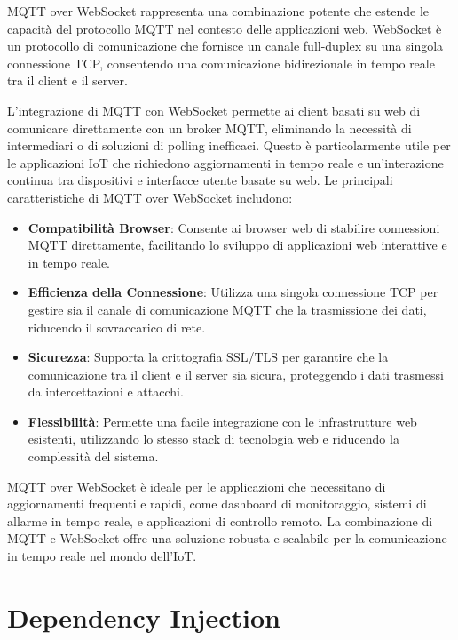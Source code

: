 \documentclass[12pt,a4paper,openright,twoside]{book}
\begin{document}
\ac{MQTT} over WebSocket rappresenta una combinazione potente che estende le capacità del protocollo \ac{MQTT} nel contesto delle applicazioni web. WebSocket è un protocollo 
di comunicazione che fornisce un canale full-duplex su una singola connessione \ac{TCP}, consentendo una comunicazione bidirezionale in tempo reale tra il client e il server.

L'integrazione di \ac{MQTT} con WebSocket permette ai client basati su web di comunicare direttamente con un broker \ac{MQTT}, eliminando la necessità di intermediari o di 
soluzioni di polling inefficaci. Questo è particolarmente utile per le applicazioni \ac{IoT} che richiedono aggiornamenti in tempo reale e un'interazione continua tra 
dispositivi e interfacce utente basate su web. Le principali caratteristiche di \ac{MQTT} over WebSocket includono:

\begin{itemize}
    \item \textbf{Compatibilità Browser}: 
    Consente ai browser web di stabilire connessioni \ac{MQTT} direttamente, facilitando lo sviluppo di applicazioni web interattive e in tempo reale.
    \item \textbf{Efficienza della Connessione}: 
    Utilizza una singola connessione \ac{TCP} per gestire sia il canale di comunicazione \ac{MQTT} che la trasmissione dei dati, riducendo il sovraccarico di rete.
    \item \textbf{Sicurezza}: 
    Supporta la crittografia SSL/TLS per garantire che la comunicazione tra il client e il server sia sicura, proteggendo i dati trasmessi da intercettazioni e attacchi.
    \item \textbf{Flessibilità}: 
    Permette una facile integrazione con le infrastrutture web esistenti, utilizzando lo stesso stack di tecnologia web e riducendo la complessità del sistema.
\end{itemize}

\ac{MQTT} over WebSocket è ideale per le applicazioni che necessitano di aggiornamenti frequenti e rapidi, come dashboard di monitoraggio, sistemi di allarme in tempo reale, 
e applicazioni di controllo remoto. La combinazione di \ac{MQTT} e WebSocket offre una soluzione robusta e scalabile per la comunicazione in tempo reale nel mondo dell'\ac{IoT}.

\section{Dependency Injection}
\end{document}
